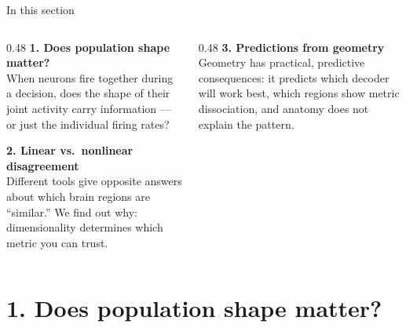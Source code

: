\documentclass[aspectratio=169,11pt]{beamer}
\begin{document}
\begin{frame}{In this section}
\begin{columns}[T]
\begin{column}{0.48\textwidth}
\textbf{1. Does population shape matter?}\\[0.2em]
{\small When neurons fire together during a decision, does the shape of their joint activity carry information --- or just the individual firing rates?}

\vspace{0.6em}
\textbf{2. Linear vs.\ nonlinear disagreement}\\[0.2em]
{\small Different tools give opposite answers about which brain regions are ``similar.'' We find out why: dimensionality determines which metric you can trust.}
\end{column}
\begin{column}{0.48\textwidth}
\textbf{3. Predictions from geometry}\\[0.2em]
{\small Geometry has practical, predictive consequences: it predicts which decoder will work best, which regions show metric dissociation, and anatomy does not explain the pattern.}
\end{column}
\end{columns}
\end{frame}

\section{1. Does population shape matter?}
\end{document}
